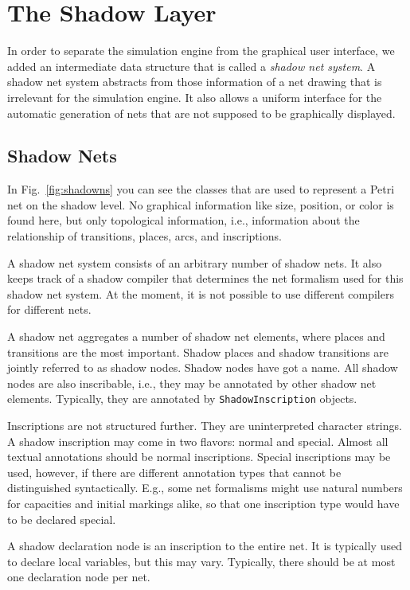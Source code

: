 \section{The Shadow Layer}

In order to separate the simulation engine from the 
graphical user interface, we added an intermediate data
structure that is called a \emph{shadow net system}.
A shadow net system abstracts from those information
of a net drawing that is irrelevant for the simulation engine.
It also allows a uniform interface for the automatic
generation of nets that are not supposed to be graphically displayed.

\subsection{Shadow Nets}

In Fig.~\ref{fig:shadowns} you can see the classes that
are used to represent a Petri net on the shadow level.
No graphical information like size, position, or color is
found here, but only topological information, i.e., information
about the relationship of transitions, places, arcs, and inscriptions.

A shadow net system consists of an arbitrary number of shadow nets.
It also keeps track of a shadow compiler that determines the 
net formalism used for this shadow net system. At the moment, it is not
possible to use different compilers for different nets.

A shadow net aggregates a number of shadow net elements, where
places and transitions are the most important.
Shadow places and shadow transitions are jointly referred to as
shadow nodes. Shadow nodes have got a name. All shadow nodes
are also inscribable, i.e., they may be annotated by
other shadow net elements. Typically, they are annotated by
\texttt{ShadowInscription} objects.

Inscriptions are not structured further. They are uninterpreted
character strings. A shadow inscription
may come in two flavors: normal and special. Almost all textual annotations
should be normal inscriptions. Special inscriptions may be used,
however, if there are different annotation types that cannot
be distinguished syntactically. E.g., some net formalisms might use
natural numbers for capacities and initial markings alike, so that
one inscription type would have to be declared special.

A shadow declaration node is an inscription to the entire net.
It is typically used to declare local variables, but
this may vary. Typically, there should be at most one 
declaration node per net.

